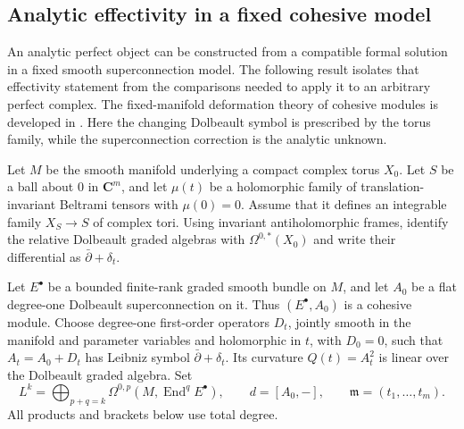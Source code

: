 \documentclass[11pt]{article}
\theoremstyle{definition}
\theoremstyle{remark}
\newcommand{\C}{\mathbf C}
\begin{document}
\subsection{Analytic effectivity in a fixed cohesive model}
\label{subsec:relative-cohesive-effectivity}

An analytic perfect object can be constructed from a compatible formal
solution in a fixed smooth superconnection model.  The following result
isolates that effectivity statement from the comparisons needed to apply
it to an arbitrary perfect complex.  The fixed-manifold deformation
theory of cohesive modules is developed in
\cite[Theorem~3.11 and Section~5]{WeiCohesive}.  Here the changing
Dolbeault symbol is prescribed by the torus family, while the
superconnection correction is the analytic unknown.

Let $M$ be the smooth manifold underlying a compact complex torus $X_0$.
Let $S$ be a ball about $0$ in $\C^m$, and let $\mu(t)$ be a holomorphic
family of translation-invariant Beltrami tensors with $\mu(0)=0$.
Assume that it defines an integrable family $X_S\to S$ of complex tori.
Using invariant antiholomorphic frames, identify the relative Dolbeault
graded algebras with $\Omega^{0,*}(X_0)$ and write their differential as
$\bar\partial+\delta_t$.

Let $E^\bullet$ be a bounded finite-rank graded smooth bundle on $M$, and
let $A_0$ be a flat degree-one Dolbeault superconnection on it.  Thus
$(E^\bullet,A_0)$ is a cohesive module.  Choose degree-one first-order
operators $D_t$, jointly smooth in the manifold and parameter variables
and holomorphic in $t$, with $D_0=0$, such that $A_t=A_0+D_t$ has
Leibniz symbol $\bar\partial+\delta_t$.  Its curvature
$Q(t)=A_t^2$ is linear over the Dolbeault graded algebra.  Set
\[
 L^k=\bigoplus_{p+q=k}
       \Omega^{0,p}(M,\operatorname{End}^q E^\bullet),
 \qquad d=[A_0,-],
 \qquad \mathfrak m=(t_1,\ldots,t_m).
\]
All products and brackets below use total degree.
\end{document}
